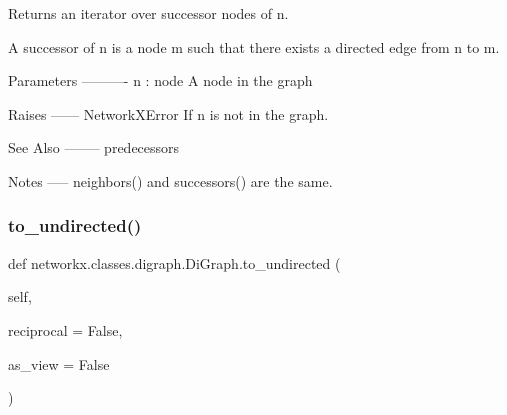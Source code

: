 \begin{DoxyVerb}Returns an iterator over successor nodes of n.

A successor of n is a node m such that there exists a directed
edge from n to m.

Parameters
----------
n : node
   A node in the graph

Raises
------
NetworkXError
   If n is not in the graph.

See Also
--------
predecessors

Notes
-----
neighbors() and successors() are the same.
\end{DoxyVerb}
 \mbox{\label{classnetworkx_1_1classes_1_1digraph_1_1DiGraph_ad8f07900eed019061ead5d2e0e206666}} 
\subsubsection{\texorpdfstring{to\+\_\+undirected()}{to\_undirected()}}
{\footnotesize\ttfamily def networkx.\+classes.\+digraph.\+Di\+Graph.\+to\+\_\+undirected (\begin{DoxyParamCaption}\item[{}]{self,  }\item[{}]{reciprocal = {\ttfamily False},  }\item[{}]{as\+\_\+view = {\ttfamily False} }\end{DoxyParamCaption})}

